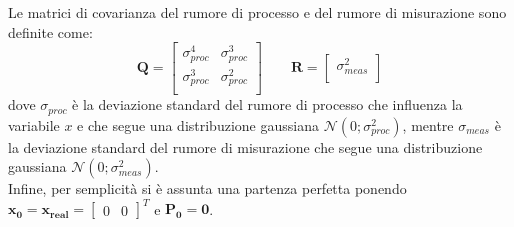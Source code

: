 Le matrici di covarianza del rumore di processo e del rumore di misurazione sono definite come:
\begin{equation*}
\textbf{Q} = 
\begin{bmatrix}
\sigma_{proc}^4 & \sigma_{proc}^3 \\
\sigma_{proc}^3  & \sigma_{proc}^2 \\
\end{bmatrix}
\qquad 
\textbf{R} = 
\begin{bmatrix}
\sigma_{meas}^2 \\
\end{bmatrix}
\end{equation*}
dove $\sigma_{proc}$ è la deviazione standard del rumore di processo che influenza la variabile $x$ e che segue una distribuzione gaussiana $\mathcal{N}(0; \sigma_{proc}^2)$, mentre $\sigma_{meas}$ è la deviazione standard del rumore di misurazione che segue una distribuzione gaussiana $\mathcal{N}(0; \sigma_{meas}^2)$.\\
Infine, per semplicità si è assunta una partenza perfetta ponendo $\mathbf{x_0 = x_{real}} = \begin{bmatrix} 0 & 0 \end{bmatrix}^T$ e $\mathbf{P_0 = 0}$.


